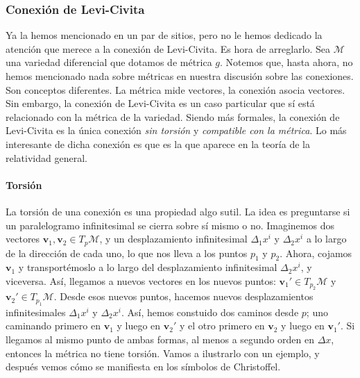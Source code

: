 \subsubsection{Conexión de Levi-Civita}
\label{subsubsec.4levicivita}

Ya la hemos mencionado en un par de sitios, pero no le hemos dedicado la atención que merece a la conexión de Levi-Civita. Es hora de arreglarlo. Sea \(\mathcal{M}\) una variedad diferencial que dotamos de métrica \(g\). Notemos que, hasta ahora, no hemos mencionado nada sobre métricas en nuestra discusión sobre las conexiones. Son conceptos diferentes. La métrica mide vectores, la conexión asocia vectores. Sin embargo, la conexión de Levi-Civita es un caso particular que sí está relacionado con la métrica de la variedad. Siendo más formales, la conexión de Levi-Civita es la única conexión \emph{sin torsión} y \emph{compatible con la métrica}. Lo más interesante de dicha conexión es que es la que aparece en la teoría de la relatividad general.

\paragraph{Torsión} La torsión de una conexión es una propiedad algo sutil. La idea es preguntarse si un paralelogramo infinitesimal se cierra sobre sí mismo o no. Imaginemos dos vectores \(\mathbf{v}_1, \mathbf{v}_2\in T_p\mathcal{M}\), y un desplazamiento infinitesimal \(\Delta_1 x^i\) y \(\Delta_2 x^i\) a lo largo de la dirección de cada uno, lo que nos lleva a los puntos \(p_1\) y \(p_2\). Ahora, cojamos \(\mathbf{v}_1\) y transportémoslo a lo largo del desplazamiento infinitesimal \(\Delta_2 x^i\), y viceversa. Así, llegamos a nuevos vectores en los nuevos puntos: \(\mathbf{v}_1'\in T_{p_2}\mathcal{M}\) y \(\mathbf{v}_2'\in T_{p_1}\mathcal{M}\). Desde esos nuevos puntos, hacemos nuevos desplazamientos infinitesimales \(\Delta_{1} x^i\) y \(\Delta_{2} x^i\). Así, hemos constuido dos caminos desde \(p\); uno caminando primero en \(\mathbf{v}_1\) y luego en \(\mathbf{v}_2'\) y el otro primero en \(\mathbf{v}_2\) y luego en \(\mathbf{v}_1'\). Si llegamos al mismo punto de ambas formas, al menos a segundo orden en \(\Delta x\), entonces la métrica no tiene torsión. Vamos a ilustrarlo con un ejemplo, y después vemos cómo se manifiesta en los símbolos de Christoffel.

